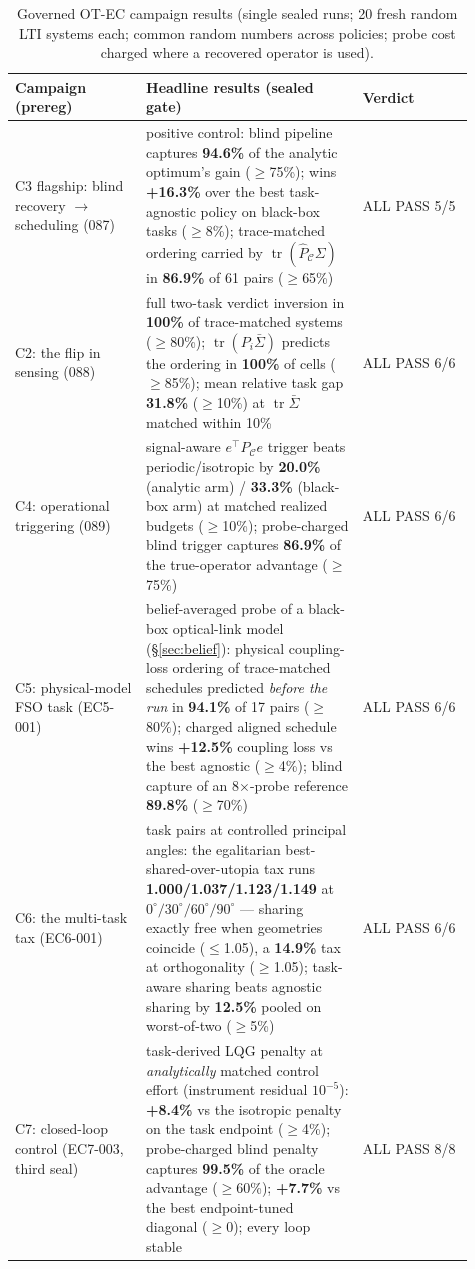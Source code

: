 \documentclass[letterpaper,onecolumn]{IEEEtran}
\theoremstyle{definition}
\theoremstyle{remark}
\newcommand{\PC}{P_{\mathcal{C}}}
\newcommand{\tr}{\operatorname{tr}}
\newcommand{\Sig}{\Sigma}
\begin{document}
\begin{table}[t]
\caption{Governed OT-EC campaign results (single sealed runs; 20 fresh
random LTI systems each; common random numbers across policies; probe cost
charged where a recovered operator is used).}
\label{tab:evidence}
\centering
\begin{tabular}{@{}p{0.26\linewidth}p{0.43\linewidth}p{0.22\linewidth}@{}}
\toprule
\textbf{Campaign (prereg)} & \textbf{Headline results (sealed gate)} & \textbf{Verdict} \\
\midrule
C3 flagship: blind recovery $\to$ scheduling (087) &
positive control: blind pipeline captures \textbf{94.6\%} of the analytic
optimum's gain ($\ge$75\%); wins \textbf{+16.3\%} over the best
task-agnostic policy on black-box tasks ($\ge$8\%); trace-matched
ordering carried by $\tr(\widehat\PC\Sig)$ in \textbf{86.9\%} of 61 pairs
($\ge$65\%) & ALL PASS 5/5 \\
\addlinespace
C2: the flip in sensing (088) &
full two-task verdict inversion in \textbf{100\%} of trace-matched
systems ($\ge$80\%); $\tr(P_i\bar\Sig)$ predicts the ordering in
\textbf{100\%} of cells ($\ge$85\%); mean relative task gap
\textbf{31.8\%} ($\ge$10\%) at $\tr\bar\Sig$ matched within 10\% & ALL PASS 6/6 \\
\addlinespace
C4: operational triggering (089) &
signal-aware $e^{\top}\PC e$ trigger beats periodic/isotropic by
\textbf{20.0\%} (analytic arm) / \textbf{33.3\%} (black-box arm) at matched
realized budgets ($\ge$10\%); probe-charged blind trigger captures
\textbf{86.9\%} of the true-operator advantage ($\ge$75\%) & ALL PASS 6/6 \\
\addlinespace
C5: physical-model FSO task (EC5-001) &
belief-averaged probe of a black-box optical-link model
(\S\ref{sec:belief}): physical coupling-loss ordering of trace-matched
schedules predicted \emph{before the run} in \textbf{94.1\%} of 17 pairs
($\ge$80\%); charged aligned schedule wins \textbf{+12.5\%} coupling loss
vs the best agnostic ($\ge$4\%); blind capture of an 8$\times$-probe
reference \textbf{89.8\%} ($\ge$70\%) & ALL PASS 6/6 \\
\addlinespace
C6: the multi-task tax (EC6-001) &
task pairs at controlled principal angles: the egalitarian
best-shared-over-utopia tax runs \textbf{1.000/1.037/1.123/1.149} at
$0^{\circ}/30^{\circ}/60^{\circ}/90^{\circ}$ --- sharing exactly free when
geometries coincide ($\le$1.05), a \textbf{14.9\%} tax at orthogonality
($\ge$1.05); task-aware sharing beats agnostic sharing by
\textbf{12.5\%} pooled on worst-of-two ($\ge$5\%) & ALL PASS 6/6 \\
\addlinespace
C7: closed-loop control (EC7-003, third seal) &
task-derived LQG penalty at \emph{analytically} matched control effort
(instrument residual $10^{-5}$): \textbf{+8.4\%} vs the isotropic penalty
on the task endpoint ($\ge$4\%); probe-charged blind penalty captures
\textbf{99.5\%} of the oracle advantage ($\ge$60\%); \textbf{+7.7\%} vs
the best endpoint-tuned diagonal ($\ge$0); every loop stable & ALL PASS 8/8 \\
\bottomrule
\end{tabular}
\end{table}
\end{document}
